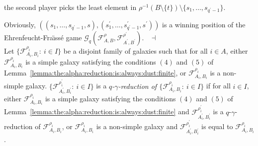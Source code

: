 \documentclass[draft]{article}
\newenvironment{proof}{{\bf Proof:}}{~$\dashv$\\}
\begin{document}
\begin{proof}
\begin{itemize}
\begin{itemize}
\begin{itemize}
%
%
\end{itemize}
%
%
\end{itemize}
%
%
the second player picks the least element in ${\rho}^{{-}1}(B{\setminus}\{t\}){\setminus}\{s_{1},\ldots,s_{q^{\prime}{-}1}\}$.
%
%
\end{itemize}
%
%
Obviously, $((s_{1},\ldots,s_{q^{\prime}{-}1},s),(s^{\prime}_{1},\ldots,s^{\prime}_{q^{\prime}{-}1},s^{\prime}))$ is a winning position of the Eh\-renfeucht-Fra\"\i ss\'e game ${\mathcal G}_{q}({\mathcal F}_{A,B}^{\rho},{\mathcal F}_{A^{\prime},B^{\prime}}^{\rho^{\prime}})$.
%
%
\medskip
%
%
\end{proof}
%
%
Let $\{{\mathcal F}_{A_{i},B_{i}}^{\rho_{i}}:\ i{\in}I\}$ be a disjoint family of galaxies such that for all $i{\in}A$, either ${\mathcal F}_{A_{i},B_{i}}^{\rho_{i}}$ is a simple galaxy satisfying the conditions $(4)$ and $(5)$ of Lemma~\ref{lemma:the:alpha:reduction:is:always:dust:finite}, or ${\mathcal F}_{A_{i},B_{i}}^{\rho_{i}}$ is a non-simple galaxy.
$\{{\mathcal F}_{A_{i}^{\prime},B_{i}^{\prime}}^{\rho_{i}^{\prime}}:\ i{\in}I\}$ is a {\it $q$-$\gamma$-reduction of $\{{\mathcal F}_{A_{i},B_{i}}^{\rho_{i}}:\ i{\in}I\}$}\/ if for all $i{\in}I$, either ${\mathcal F}_{A_{i},B_{i}}^{\rho_{i}}$ is a simple galaxy satisfying the conditions $(4)$ and $(5)$ of Lemma~\ref{lemma:the:alpha:reduction:is:always:dust:finite} and ${\mathcal F}_{A_{i}^{\prime},B_{i}^{\prime}}^{\rho_{i}^{\prime}}$ is a $q$-$\gamma$-reduction of ${\mathcal F}_{A_{i},B_{i}}^{\rho_{i}}$, or ${\mathcal F}_{A_{i},B_{i}}^{\rho_{i}}$ is a non-simple galaxy and ${\mathcal F}_{A_{i}^{\prime},B_{i}^{\prime}}^{\rho_{i}^{\prime}}$ is equal to ${\mathcal F}_{A_{i},B_{i}}^{\rho_{i}}$.
%
%
\end{document}
